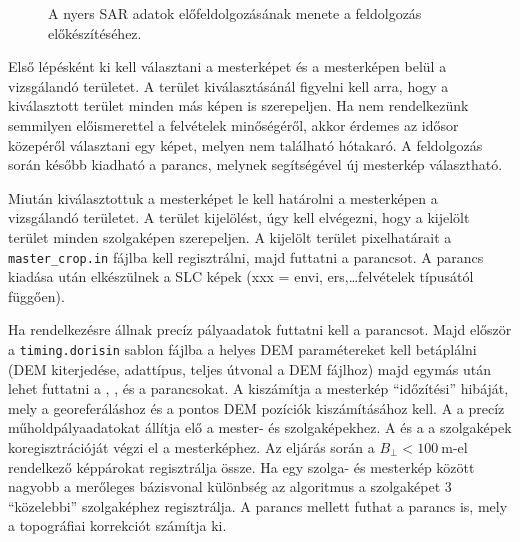 \documentclass[12pt]{report}
\numberwithin{equation}{section}
\numberwithin{table}{section}
\numberwithin{figure}{section}
\begin{document}
\begin{figure}[H]
    \caption{A nyers SAR adatok előfeldolgozásának menete a \stamps feldolgozás előkészítéséhez.}\label{processing_flowchart}
\end{figure}

Első lépésként ki kell választani a mesterképet és a mesterképen belül a vizsgálandó területet. A terület kiválasztásánál figyelni kell arra, hogy a kiválasztott terület minden más képen is szerepeljen. Ha nem rendelkezünk semmilyen előismerettel a felvételek minőségéről, akkor érdemes az idősor közepéről választani egy képet, melyen nem található hótakaró. A feldolgozás során később kiadható a  parancs, melynek segítségével új mesterkép választható.

Miután kiválasztottuk a mesterképet le kell határolni a mesterképen a vizsgálandó területet. A terület kijelölést, úgy kell elvégezni, hogy a kijelölt terület minden szolgaképen szerepeljen. A kijelölt terület pixelhatárait a \texttt{master\_crop.in} fájlba kell regisztrálni, majd futtatni a  parancsot. A  parancs kiadása után elkészülnek a SLC képek (xxx = envi, ers,\dots felvételek típusától függően).

Ha rendelkezésre állnak precíz pályaadatok futtatni kell a  parancsot. Majd először a \texttt{timing.dorisin} sablon fájlba a helyes DEM paramétereket kell betáplálni (DEM kiterjedése, adattípus, teljes útvonal a DEM fájlhoz) majd egymás után lehet futtatni a , ,  és a  parancsokat. A  kiszámítja a mesterkép ``időzítési'' hibáját, mely a georeferáláshoz és a pontos DEM pozíciók kiszámításához kell. A  a precíz műholdpályaadatokat állítja elő a mester- és szolgaképekhez. A  és a  a szolgaképek koregisztrációját végzi el a mesterképhez.  Az eljárás során a $B_{\perp} < \SI{100}{\meter}$-el rendelkező képpárokat regisztrálja össze. Ha egy szolga- és mesterkép között nagyobb a merőleges bázisvonal különbség az algoritmus a szolgaképet 3 ``közelebbi'' szolgaképhez regisztrálja. A  parancs mellett futhat a  parancs is, mely a topográfiai korrekciót számítja ki.
\end{document}
